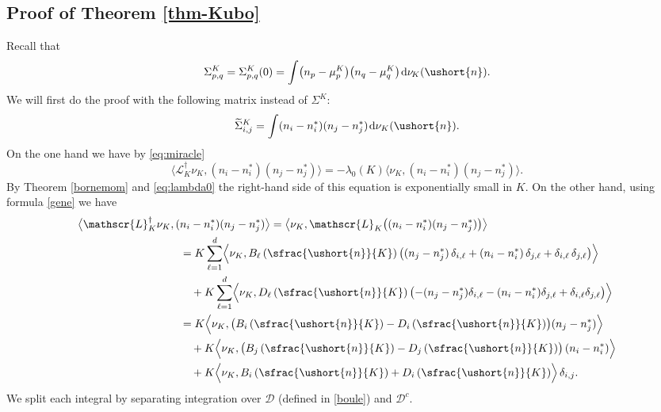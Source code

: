 \documentclass[10pt]{amsart}
\newcommand{\scaleto}[2]{#1}
\let\mathcal\mathscr
\numberwithin{equation}{section}
\theoremstyle{plain}
\theoremstyle{definition}
\newcommand{\sK}{K}
\newcommand{\gen}{\mathscr{L}_{\sK}}
\newcommand{\vecn}{\ushort{n}}
\newcommand{\nuk}{\nu_{K}}\let\snuk\nuk
\newcommand{\dd}{\hspace{1pt}\mathrm{d}}
\begin{document}
\subsection{Proof of Theorem \ref{thm-Kubo}}\label{proof:kuboeq}

Recall that
\[
\Sigma^{\sK}_{p,q}=\Sigma^{\sK}_{p,q}(0)=\int \bigl(n_{p}-\mu_{p}^{\sK}\bigr) \bigl(n_{q}-\mu_{q}^{\sK}\bigr) \dd\nu\!_{\sK}(\vecn).
\]
We will first do the proof with the following matrix instead of $\Sigma^{\sK}$:
\[
\widetilde\Sigma^{\sK}_{i,j}=\int (n_{i}-n_{i}^{\scaleto{*}{2.5pt}})(n_{j}-n_{j}^{\scaleto{*}{2.5pt}}) \dd \nuk(\vecn).
\]
On the one hand we have by \eqref{eq:miracle}
\[
\big\langle \gen^{\dagger}\nuk,(n_{i}-n^{\scaleto{*}{2.5pt}}_{i})(n_{j}-n^{\scaleto{*}{2.5pt}}_{j})\big\rangle=-\lambda_{0}(K)
\big\langle\nuk,(n_{i}-n^{\scaleto{*}{2.5pt}}_{i})(n_{j}-n^{\scaleto{*}{2.5pt}}_{j})\big\rangle.
\]
By Theorem \ref{bornemom} and \eqref{eq:lambda0} the right-hand side of this equation is exponentially small in $K$.
On the other hand, using formula \eqref{gene} we have
\begin{align*}
\big\langle \gen^{\dagger}\nuk,(&n_{i}-n^{\scaleto{*}{2.5pt}}_{i})(n_{j}-n^{\scaleto{*}{2.5pt}}_{j})\big\rangle=
\big\langle \nuk,\gen\bigl((n_{i}-n^{\scaleto{*}{2.5pt}}_{i})(n_{j}-n^{\scaleto{*}{2.5pt}}_{j})\bigr)\big\rangle\\
& =K\sum_{\ell=1}^{d}\Bigl\langle\nuk,B_{\ell}\left(\sfrac{\vecn}{K}\right)\bigl((n_{j}-n^{\scaleto{*}{2.5pt}}_{j})\,\delta_{i,\ell}+
(n_{i}-n^{\scaleto{*}{2.5pt}}_{i})\,\delta_{j,\ell} +\delta_{i,\ell}\,\delta_{j,\ell}\bigr)\Bigr\rangle\\
& \quad +K\sum_{\ell=1}^{d}\Bigl\langle\nuk,D_{\ell}\left(\sfrac{\vecn}{K}\right)\bigl(-(n_{j}-n^{\scaleto{*}{2.5pt}}_{j})\delta_{i,\ell}-(n_{i}-n^{\scaleto{*}{2.5pt}}_{i})
\delta_{j,\ell}+\delta_{i,\ell}\delta_{j,\ell}\bigr)\Bigr\rangle\\
& =K\Bigl\langle\nuk,\bigl(B_{i}\left(\sfrac{\vecn}{K}\right)-D_{i}\left(\sfrac{\vecn}{K}\right)\bigr)(n_{j}-n^{\scaleto{*}{2.5pt}}_{j})\Bigr\rangle\\
& \quad +K\Bigl\langle\nuk,\bigl(B_{j}\left(\sfrac{\vecn}{K}\right)-D_{j}\left(\sfrac{\vecn}{K}\right)\bigr)\,(n_{i}-n^{\scaleto{*}{2.5pt}}_{i})
\Bigr\rangle\\
& \quad +K \Bigl\langle\nuk,B_{i}\left(\sfrac{\vecn}{K}\right)+D_{i}\left(\sfrac{\vecn}{K}\right)\Bigr\rangle\, \delta_{i,j}.
\end{align*}
We split each integral by separating integration over $\mathcal{D}$ (defined in \eqref{boule}) and $\mathcal{D}^c$.
\end{document}
